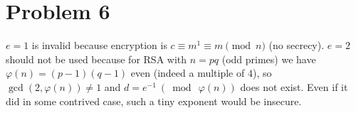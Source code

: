 \section*{Problem 6}

$e=1$ is invalid because encryption is $c\equiv m^1\equiv m\pmod{n}$ (no secrecy).
$e=2$ should not be used because for RSA with $n=pq$ (odd primes) we have
$\varphi(n)=(p-1)(q-1)$ even (indeed a multiple of $4$), so $\gcd(2,\varphi(n))\neq 1$ and
$d=e^{-1}\ (\bmod\ \varphi(n))$ does not exist. Even if it did in some contrived case,
such a tiny exponent would be insecure.
